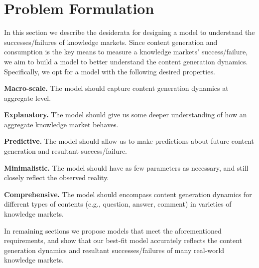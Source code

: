 \section{Problem Formulation} 
In this section we describe the desiderata for designing a model to understand the successes/failures of knowledge markets. Since content generation and consumption is the key means to measure a knowledge markets' success/failure, we aim to build a model to better understand the content generation dynamics. Specifically, we opt for a model with the following desired properties.


\textbf{Macro-scale.} The model should capture content generation dynamics at aggregate level. 

\textbf{Explanatory.} The model should give us some deeper understanding of how an aggregate knowledge market behaves.

\textbf{Predictive.} The model should allow us to make predictions about future content generation and resultant success/failure.

\textbf{Minimalistic.} The model should have as few parameters as necessary, and still closely reflect the observed reality.

\textbf{Comprehensive.} The model should encompass content generation dynamics for different types of contents (e.g., question, answer, comment) in varieties of knowledge markets.

In remaining sections we propose models that meet the aforementioned requirements, and show that our best-fit model accurately reflects the content generation dynamics and resultant successes/failures of many real-world knowledge markets.

